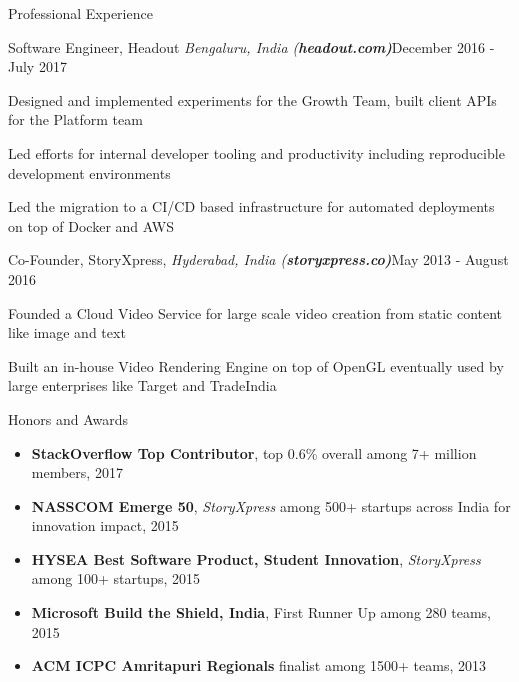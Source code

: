 \documentclass{resume}
\begin{document}
\begin{rSection}{Professional Experience}

\begin{rSubsection}{Software Engineer, Headout \it{Bengaluru, India} (\bf{headout.com})}{December 2016 - July 2017}{}{}
\item Designed and implemented experiments for the Growth Team, built client APIs for the Platform team
\item Led efforts for internal developer tooling and productivity including reproducible development environments
\item Led the migration to a CI/CD based infrastructure for automated deployments on top of Docker and AWS

\end{rSubsection}

\begin{rSubsection}{Co-Founder, StoryXpress, \it{Hyderabad, India} (\bf{storyxpress.co})}{May 2013 - August 2016}{}{}
\item Founded a Cloud Video Service for large scale video creation from static content like image and text
\item Built an in-house Video Rendering Engine on top of OpenGL eventually used by large enterprises like Target and TradeIndia

\end{rSubsection}

\end{rSection}

\begin{rSection}{Honors and Awards}
  \begin{itemize}[label={},topsep=0pt,itemsep=-0.5ex,partopsep=1ex,parsep=1ex,leftmargin=0.25em]
  \item  {\bf StackOverflow Top Contributor}, top 0.6\% overall among 7+ million members, 2017
  \item {\bf NASSCOM Emerge 50}, {\it StoryXpress} among 500+ startups across India for innovation impact, 2015
  \item {\bf HYSEA Best Software Product, Student Innovation}, {\it StoryXpress} among 100+ startups, 2015
  \item {\bf Microsoft Build the Shield, India}, First Runner Up among 280 teams, 2015
  \item {\bf ACM ICPC Amritapuri Regionals} finalist among 1500+ teams, 2013
  \end{itemize}
\end{rSection}
\end{document}
